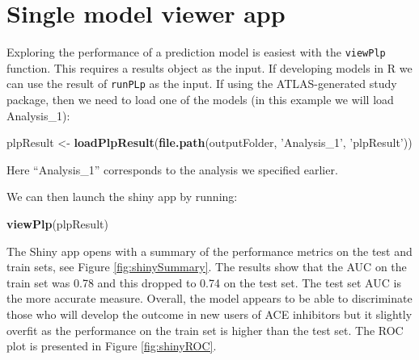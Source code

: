 \documentclass[11pt]{book}
\newenvironment{Shaded}{\begin{snugshade}}{\end{snugshade}}
\newcommand{\KeywordTok}[1]{\textcolor[rgb]{0.13,0.29,0.53}{\textbf{#1}}}
\newcommand{\NormalTok}[1]{#1}
\newcommand{\StringTok}[1]{\textcolor[rgb]{0.31,0.60,0.02}{#1}}
\theoremstyle{definition}
\theoremstyle{definition}
\theoremstyle{definition}
\theoremstyle{remark}
\begin{document}
\hypertarget{single-model-viewer-app}{%
\section{Single model viewer app}\label{single-model-viewer-app}}

Exploring the performance of a prediction model is easiest with the \texttt{viewPlp} function. This requires a results object as the input. If developing models in R we can use the result of \texttt{runPLp} as the input. If using the ATLAS-generated study package, then we need to load one of the models (in this example we will load Analysis\_1):

\begin{Shaded}
\begin{Highlighting}[]
\NormalTok{plpResult <-}\StringTok{ }\KeywordTok{loadPlpResult}\NormalTok{(}\KeywordTok{file.path}\NormalTok{(outputFolder, }
                                     \StringTok{'Analysis_1'}\NormalTok{, }
                                     \StringTok{'plpResult'}\NormalTok{))}
\end{Highlighting}
\end{Shaded}

Here ``Analysis\_1'' corresponds to the analysis we specified earlier.

We can then launch the shiny app by running:

\begin{Shaded}
\begin{Highlighting}[]
\KeywordTok{viewPlp}\NormalTok{(plpResult)}
\end{Highlighting}
\end{Shaded}

The Shiny app opens with a summary of the performance metrics on the test and train sets, see Figure \ref{fig:shinySummary}. The results show that the AUC on the train set was 0.78 and this dropped to 0.74 on the test set. The test set AUC is the more accurate measure. Overall, the model appears to be able to discriminate those who will develop the outcome in new users of ACE inhibitors but it slightly overfit as the performance on the train set is higher than the test set. The ROC plot is presented in Figure \ref{fig:shinyROC}.
\end{document}
